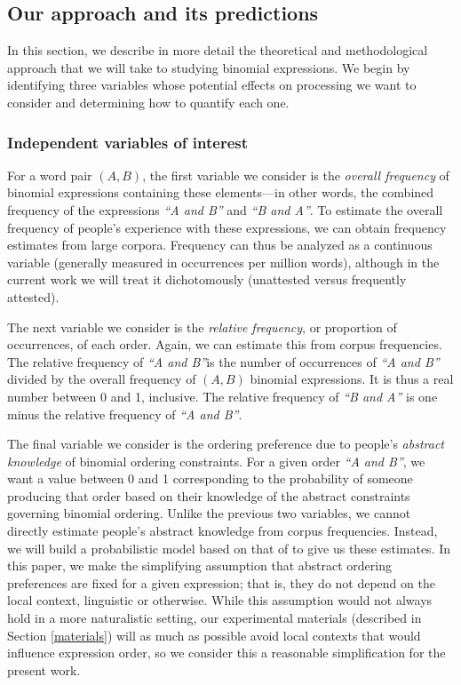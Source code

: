 \documentclass[authoryear]{elsarticle}
\begin{document}
\subsection{Our approach and its predictions}

In this section, we describe in more detail the theoretical and methodological approach that we will take to studying binomial expressions. We begin by identifying three variables whose potential effects on processing we want to consider and determining how to quantify each one.



\subsubsection{Independent variables of interest}\label{ivs}

For a word pair $(A,B)$, the first variable we consider is the \emph{overall frequency} of binomial expressions containing these elements---in other words, the combined frequency of the expressions \emph{``A and B''} and \emph{``B and A''}. To estimate the overall frequency of people's experience with these expressions, we can obtain frequency estimates from large corpora. Frequency can thus be analyzed as a continuous variable (generally measured in occurrences per million words), although in the current work we will treat it dichotomously (unattested versus frequently attested).

The next variable we consider is the \emph{relative frequency}, or proportion of occurrences, of each order. Again, we can estimate this from corpus frequencies. The relative frequency of \emph{``A and B''}is the number of occurrences of \emph{``A and B''} divided by the overall frequency of $(A,B)$ binomial expressions. It is thus a real number between 0 and 1, inclusive. The relative frequency of \emph{``B and A''} is one minus the relative frequency of \emph{``A and B''}.

The final variable we consider is the ordering preference due to people's \emph{abstract knowledge} of binomial ordering constraints. For a given order \emph{``A and B''}, we want a value between 0 and 1 corresponding to the probability of someone producing that order based on their knowledge of the abstract constraints governing binomial ordering. Unlike the previous two variables, we cannot directly estimate people's abstract knowledge from corpus frequencies. Instead, we will build a probabilistic model based on that of \citet{Benor:2006gv} to give us these estimates. In this paper, we make the simplifying assumption that abstract ordering preferences are fixed for a given expression; that is, they do not depend on the local context, linguistic or otherwise. While this assumption would not always hold in a more naturalistic setting, our experimental materials (described in Section \ref{materials}) will as much as possible avoid local contexts that would influence expression order, so we consider this a reasonable simplification for the present work.
\end{document}
